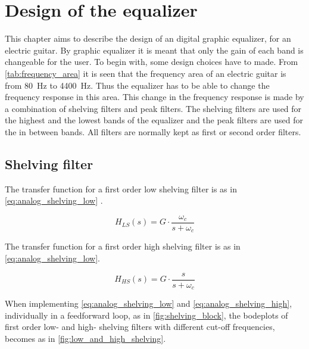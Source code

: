 \section{Design of the equalizer}
This chapter aims to describe the design of an digital graphic equalizer, for an electric guitar. By graphic equalizer it is meant that only the gain of each band is changeable for the user.  
To begin with, some design choices have to made. From \autoref{tab:frequency_area} it is seen that the frequency area of an electric guitar is from \SI{80}{\hertz} to \SI{4400}{\hertz}. Thus the equalizer has to be able to change the frequency response in this area. This change in the frequency response is made by a combination of shelving filters and peak filters. The shelving filters are used for the highest and the lowest bands of the equalizer and the peak filters are used for the in between bands. All filters are normally kept as first or second order filters. 

\subsection{Shelving filter}
The transfer function for a first order low shelving filter is as in \autoref{eq:analog_shelving_low} \citep{Julius_smith}.

\begin{equation}\label{eq:analog_shelving_low}
        H_{LS}(s) = G \cdot \frac{\omega_c}{s+\omega_c}
    \end{equation}

    \startexplain
    \stopexplain
    
The transfer function for a first order high shelving filter is as in \autoref{eq:analog_shelving_low}.

\begin{equation}\label{eq:analog_shelving_high}
        H_{HS}(s) = G \cdot \frac{s}{s+\omega_c}
    \end{equation}

    \startexplain
    \stopexplain

    
When implementing \autoref{eq:analog_shelving_low} and \autoref{eq:analog_shelving_high}, individually in a feedforward loop, as in \autoref{fig:shelving_block}, the bodeplots of first order low- and high- shelving filters with different cut-off frequencies, becomes as in \autoref{fig:low_and_high_shelving}.

